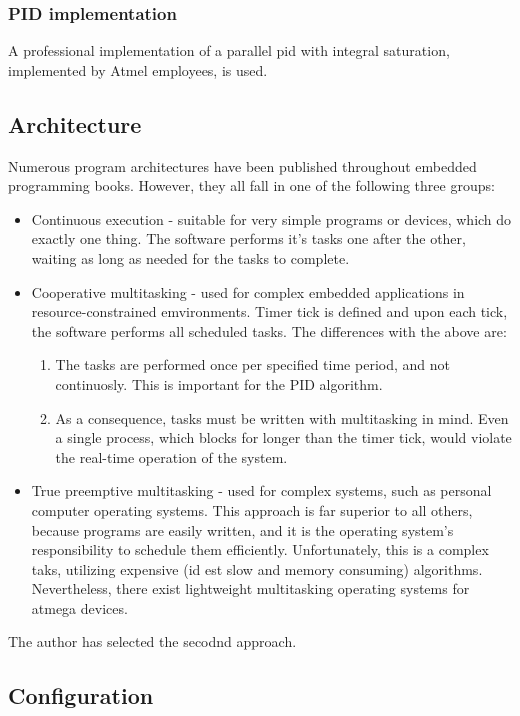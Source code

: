 \subsubsection{PID implementation}
A professional implementation of a parallel pid with integral saturation, implemented by Atmel employees, is used.

\subsection{Architecture}
Numerous program architectures have been published throughout embedded programming books.
However, they all fall in one of the following three groups:
\begin{itemize}
\item{Continuous execution - suitable for very simple programs or devices, which do exactly one thing.
The software performs it's tasks one after the other, waiting as long as needed for the tasks to complete.}
\item{Cooperative multitasking - used for complex embedded applications in resource-constrained emvironments.
Timer tick is defined and upon each tick, the software performs all scheduled tasks.
The differences with the above are:}
\begin{enumerate}
\item{The tasks are performed once per specified time period, and not continuosly.
This is important for the PID algorithm.}
\item{As a consequence, tasks must be written with multitasking in mind.
Even a single process, which blocks for longer than the timer tick, would violate the real-time operation of the system.}
\end{enumerate}
\item{True preemptive multitasking - used for complex systems, such as personal computer operating systems.
This approach is far superior to all others, because programs are easily written, and it is the operating system's responsibility to schedule them efficiently.
Unfortunately, this is a complex taks, utilizing expensive (id est slow and memory consuming) algorithms.
Nevertheless, there exist lightweight multitasking operating systems for atmega devices.}
\end{itemize}
The author has selected the secodnd approach.

\subsection{Configuration}

